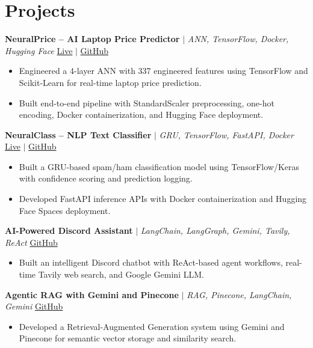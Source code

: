 \documentclass[a4paper,9pt]{article}
\newcommand{\resumeItem}[1]{\item\small #1}
\begin{document}
\vspace{-2mm}

\section{Projects}

\noindent\textbf{NeuralPrice -- AI Laptop Price Predictor} $|$ \textit{ANN, TensorFlow, Docker, Hugging Face} \hfill
\href{https://huggingface.co/spaces/Harsh0809/laptop-price-predictor-Ann}{\small Live} $|$
\href{https://github.com/hsachan295-source/Laptop-Price-Prediction-ANN}{\small GitHub}
\begin{itemize}
\resumeItem{Engineered a 4-layer ANN with 337 engineered features using TensorFlow and Scikit-Learn for real-time laptop price prediction.}
\resumeItem{Built end-to-end pipeline with StandardScaler preprocessing, one-hot encoding, Docker containerization, and Hugging Face deployment.}
\end{itemize}

\vspace{1.5pt}
\noindent\textbf{NeuralClass -- NLP Text Classifier} $|$ \textit{GRU, TensorFlow, FastAPI, Docker} \hfill
\href{https://huggingface.co/spaces/Harsh0809/gru-text-classifier}{\small Live} $|$
\href{https://github.com/hsachan295-source/Email-Spam-Detector}{\small GitHub}
\begin{itemize}
\resumeItem{Built a GRU-based spam/ham classification model using TensorFlow/Keras with confidence scoring and prediction logging.}
\resumeItem{Developed FastAPI inference APIs with Docker containerization and Hugging Face Spaces deployment.}
\end{itemize}

\vspace{1.5pt}
\noindent\textbf{AI-Powered Discord Assistant} $|$ \textit{LangChain, LangGraph, Gemini, Tavily, ReAct} \hfill
\href{https://github.com/hsachan295-source/AI-Powered-Discord-Assistant}{\small GitHub}
\begin{itemize}
\resumeItem{Built an intelligent Discord chatbot with ReAct-based agent workflows, real-time Tavily web search, and Google Gemini LLM.}
\end{itemize}

\vspace{1.5pt}
\noindent\textbf{Agentic RAG with Gemini and Pinecone} $|$ \textit{RAG, Pinecone, LangChain, Gemini} \hfill
\href{https://github.com/hsachan295-source/Agentic-RAG-with-Gemini-and-Pinecone}{\small GitHub}
\begin{itemize}
\resumeItem{Developed a Retrieval-Augmented Generation system using Gemini and Pinecone for semantic vector storage and similarity search.}
\end{itemize}
\end{document}
